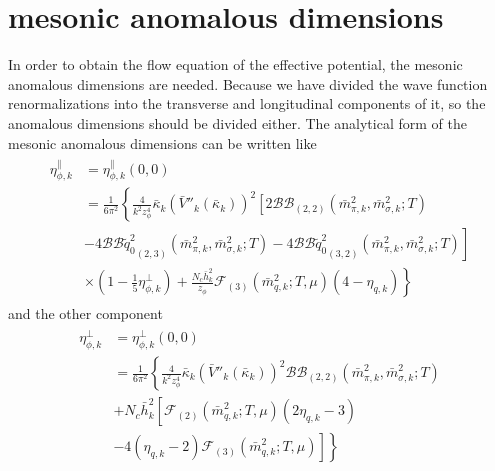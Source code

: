 \documentclass[%
reprint,
superscriptaddress,
showpacs,preprintnumbers,
 amsmath,amssymb,
 aps,
prd,
]{revtex4-1}
\begin{document}


\section{mesonic anomalous dimensions}\label{b}
In order to obtain the flow equation of the effective potential, the mesonic anomalous dimensions are needed. Because 
we have divided the wave function renormalizations into the transverse and longitudinal components of it, so the 
anomalous dimensions should be divided either.
The analytical form of the mesonic anomalous dimensions can be written like
\begin{align}
\begin{split}
\eta_{\phi,k}^{\|}&=\eta_{\phi,k}^{\|}(0,0)\\
&=\frac{1}{6\pi^2}\left\{ 
 \frac{4}{k^2z_\phi^4}\bar{\kappa}_k(\bar{V}''_k(\bar{\kappa}_k))^2\left[ 
 2\mathcal{BB}_{(2,2)}(\bar{m}^{2}_{\pi,k},\bar{m}^{2}_{\sigma,k};T)\right.\right.\\
&\left.\left.-4{\mathcal{BB}\tilde{q}^{2}_{0}}_{(2,3)}(\bar{m}^{2}_{\pi,k},\bar{m}^{2}_{\sigma,k};T)-4{\mathcal{BB}
\tilde{q}^{2}_{0}}_{(3,2)}(\bar{m}^{2}_{\pi,k},\bar{m}^{2}_{\sigma,k};T)\right]\right.\\
&\left.\times(1-\frac{1}{5}\eta^{\bot}_{\phi,k})+\frac{N_c\bar{h}^{2}_{k}}{z_\phi}\mathcal{F}_{(3)}(\bar{m}^{2}_{q,k};T,\mu)(4-\eta_{q,k})
\right\}   
\end{split}
\end{align} 
and the other component
\begin{align}
\begin{split}
\eta_{\phi,k}^{\bot}&=\eta_{\phi,k}^{\bot}(0,0)\\
&=\frac{1}{6\pi^2}\left\{ 
\frac{4}{k^2z_\phi^4}\bar{\kappa}_k(\bar{V}''_k(\bar{\kappa}_k))^2 \mathcal{BB}_{(2,2)}(\bar{m}^{2}_{\pi,k},\bar{m}^{2}_{\sigma,k};T)
\right.\\&\left.+N_c\bar{h}^{2}_{k}\left[\mathcal{F}_{(2)}(\bar{m}^{2}_{q,k};T,\mu)(2\eta_{q,k}-3)\right.\right.\\
&\left.\left.-4(\eta_{q,k}-2)\mathcal{F}_{(3)}(\bar{m}^2_{q,k};T,\mu)\right]
\right\}   
\end{split}
\end{align} 


\end{document}
